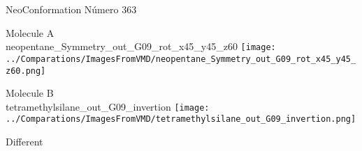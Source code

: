 \vtab[-2cm]
\begin{center}
{\large NeoConformation \tab Número 363}
\end{center}
\begin{multicols}{2}
\begin{center}
Molecule A \\ 
neopentane\_Symmetry\_out\_G09\_rot\_x45\_y45\_z60
\texttt{[image: ../Comparations/ImagesFromVMD/neopentane\_Symmetry\_out\_G09\_rot\_x45\_y45\_z60.png]}
\\
\vtab

\columnbreak
Molecule B \\ 
tetramethylsilane\_out\_G09\_invertion
\texttt{[image: ../Comparations/ImagesFromVMD/tetramethylsilane\_out\_G09\_invertion.png]}
\\
\vtab


\end{center}
\end{multicols}
\begin{center}
\vtab
\vtab
\textcolor{NavyBlue}{\Large Different}
\end{center}

 \newpage

